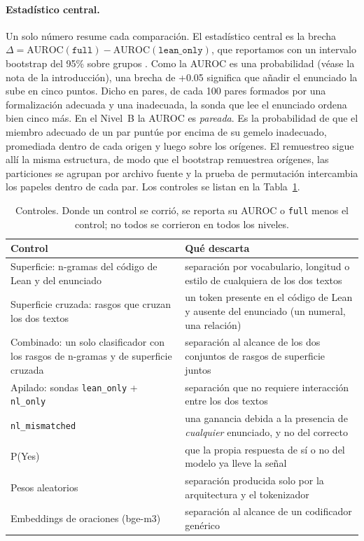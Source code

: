 \documentclass[10pt]{article}
\newcommand{\vr}[1]{\texttt{#1}}
\newcommand{\D}{\Delta}
\begin{document}
\paragraph{Estadístico central.}
Un solo número resume cada comparación.
El estadístico central es la brecha
$\D = \mathrm{AUROC}(\vr{full}) - \mathrm{AUROC}(\vr{lean\_only})$, que reportamos con un intervalo bootstrap del 95\% sobre grupos \citep{efron}.
Como la AUROC es una probabilidad (véase la nota de la introducción), una brecha de +0.05 significa que añadir el
enunciado la sube en cinco puntos. Dicho en pares, de cada 100 pares formados por una formalización adecuada y una
inadecuada, la sonda que lee el enunciado ordena bien cinco más.
En el Nivel~B la AUROC es \emph{pareada}. Es la probabilidad de que el miembro adecuado de un par puntúe por encima
de su gemelo inadecuado, promediada dentro de cada origen y luego sobre los orígenes. El remuestreo sigue allí la
misma estructura, de modo que el bootstrap remuestrea orígenes, las particiones se agrupan por archivo fuente y la
prueba de permutación intercambia los papeles dentro de cada par.
Los controles se listan en la Tabla~\ref{tab:controles}.

\begin{table}[h]
\centering
\caption{Controles. Donde un control se corrió, se reporta su AUROC o \vr{full} menos el control; no todos se corrieron en todos los niveles.}
\label{tab:controles}
\vspace{2pt}
\begin{tabularx}{\linewidth}{@{}lX@{}}
\toprule
Control & Qué descarta\\
\midrule
Superficie: n-gramas del código de Lean y del enunciado & separación por vocabulario, longitud o estilo de cualquiera de los dos textos\\
Superficie cruzada: rasgos que cruzan los dos textos & un token presente en el código de Lean y ausente del enunciado (un numeral, una relación)\\
Combinado: un solo clasificador con los rasgos de n-gramas y de superficie cruzada & separación al alcance de los dos conjuntos de rasgos de superficie juntos\\
Apilado: sondas \vr{lean\_only} + \vr{nl\_only} & separación que no requiere interacción entre los dos textos\\
\vr{nl\_mismatched} & una ganancia debida a la presencia de \emph{cualquier} enunciado, y no del correcto\\
P(Yes) & que la propia respuesta de sí o no del modelo ya lleve la señal\\
Pesos aleatorios & separación producida solo por la arquitectura y el tokenizador\\
Embeddings de oraciones (bge-m3) & separación al alcance de un codificador genérico\\
\bottomrule
\end{tabularx}
\end{table}
\end{document}
